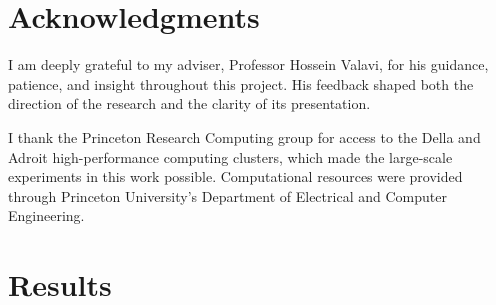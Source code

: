 \documentclass[12pt,oneside]{report}
\title{\reporttitle}
\author{\reportauthor}
\date{\reportdate}
\begin{document}




\newpage
\thispagestyle{empty}
\chapter*{Acknowledgments}
I am deeply grateful to my adviser, Professor Hossein Valavi, for his guidance, patience, and insight throughout this project.
His feedback shaped both the direction of the research and the clarity of its presentation.

I thank the Princeton Research Computing group for access to the Della and Adroit high-performance computing clusters, which made the large-scale experiments in this work possible.
Computational resources were provided through Princeton University's Department of Electrical and Computer Engineering.

\tableofcontents
\newpage
{}





\chapter{Results}
\label{ch:results}








\appendix

\end{document}
